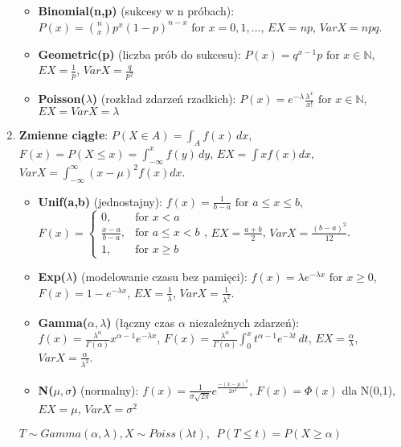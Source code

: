 \documentclass[12pt]{article}
\begin{document}
\begin{enumerate}
\begin{itemize}[noitemsep]
            \item \textbf{Binomial(n,p)} (sukcesy w n próbach):  $P(x) = \binom{n}{x} p^x (1-p)^{n-x} \text{ for } x = 0,1,\dots$,
            $EX = np$, $VarX = npq$.

            \item \textbf{Geometric(p)} (liczba prób do sukcesu):  $P(x) = q^{x-1}p \text{ for } x \in \mathbb{N}$,
            $EX = \frac{1}{p}$, $VarX = \frac{q}{p^2}$

            \item \textbf{Poisson($\lambda$)} (rozkład zdarzeń rzadkich): $P(x) = e^{-\lambda} \frac{\lambda^x}{x!} \text{ for } x \in \mathbb{N}$,
            $EX = VarX = \lambda$
        \end{itemize}

        \item \textbf{Zmienne ciągłe}: $P(X \in A) = \int_{A} f(x)\,dx$, $F(x) = P(X \leq x) = \int_{-\infty}^{x}f(y)\,dy$,
        $EX = \int xf(x) dx$, $VarX = \int_{- \infty}^{\infty} (x - \mu)^2 f(x) dx$.
        \begin{itemize}[noitemsep]
            \item \textbf{Unif(a,b)} (jednostajny): $f(x) = \frac{1}{b-a} \text{ for } a \leq x \leq b$,
            $F(x) = \left\{\begin{array}{lr}
                               0,               & \text{for } x < a        \\
                               \frac{x-a}{b-a}, & \text{for } a \leq x < b \\
                               1,               & \text{for } x \geq b
            \end{array}\right.$, $EX = \frac{a+b}{2}$, $VarX = \frac{(b-a)^2}{12}$.
            \item \textbf{Exp($\lambda$)} (modelowanie czasu bez pamięci):
            $f(x) = \lambda e^{-\lambda x} \text{ for } x \geq 0$,
            $F(x) = 1 - e^{-\lambda x}$, $EX = \frac{1}{\lambda}$, $VarX = \frac{1}{\lambda^2}$.
            \item \textbf{Gamma($\alpha, \lambda$)} (łączny czas $\alpha$ niezależnych zdarzeń):
            $f(x) = \frac{\lambda^{\alpha}}{\Gamma (\alpha)} x^{\alpha-1} e^{-\lambda x}$,
            $F(x) = \frac{\lambda ^{\alpha}}{\Gamma(\alpha)} \int_{0}^{x} t^{\alpha-1} e^{-\lambda t} \,dt$,
            $EX = \frac{\alpha}{\lambda}$, $VarX = \frac{\alpha}{\lambda ^2}$.
            \item \textbf{N($\mu, \sigma$)} (normalny):
            $f(x) = \frac{1}{\sigma \sqrt{2 \pi}} e^{\frac{-(x - \mu)^2}{2 \sigma^2}}$,
            $F(x) = \Phi(x)$ dla N(0,1), $EX = \mu$, $VarX = \sigma^2$
        \end{itemize}
        $T \sim Gamma(\alpha, \lambda), X \sim Poiss(\lambda t), ~~ P(T \leq t) = P( X \geq \alpha)$


\end{enumerate}
\end{document}
